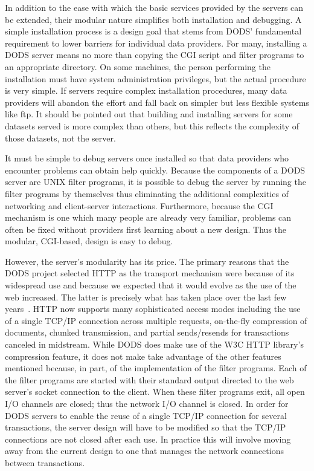 \documentclass{article}
\begin{document}
In addition to the ease with which the basic services provided by the servers
can be extended, their modular nature simplifies both installation and
debugging. A simple installation process is a design goal that stems from
\ac{DODS}' fundamental requirement to lower barriers for individual data
providers. For many, installing a \ac{DODS} server means no more than copying
the \ac{CGI} script and filter programs to an appropriate directory. On some
machines, the person performing the installation must have system
administration privileges, but the actual procedure is very simple. If
servers require complex installation procedures, many data providers will
abandon the effort and fall back on simpler but less flexible systems like
ftp. It should be pointed out that building and installing servers for some
datasets served is more complex than others, but this reflects the complexity
of those datasets, not the server.

It must be simple to debug servers once installed so that data providers who
encounter problems can obtain help quickly. Because the components of a
\ac{DODS} server are UNIX filter programs, it is possible to debug the server
by running the filter programs by themselves thus eliminating the additional
complexities of networking and client-server interactions.  Furthermore,
because the \ac{CGI} mechanism is one which many people are already very
familiar, problems can often be fixed without providers first learning about
a new design. Thus the modular, \ac{CGI}-based, design is easy to debug.

However, the server's modularity has its price. The primary reasons that the
DODS project selected HTTP as the transport mechanism were because of its
widespread use and because we expected that it would evolve as the use of the
web increased. The latter is precisely what has taken place over the last few
years~\cite{nielsen:http}. \acs{HTTP} now supports many sophisticated access
modes including the use of a single \acs{TCP/IP} connection across multiple
requests, on-the-fly compression of documents, chunked transmission, and
partial sends/resends for transactions canceled in midstream. While \ac{DODS}
does make use of the \acs{W3C} \acs{HTTP} library's compression feature, it
does not make take advantage of the other features mentioned because, in
part, of the implementation of the filter programs.  Each of the filter
programs are started with their standard output directed to the web server's
socket connection to the client. When these filter programs exit, all open
I/O channels are closed; thus the network I/O channel is closed. In order for
\ac{DODS} servers to enable the reuse of a single \acs{TCP/IP} connection for
several transactions, the server design will have to be modified so that the
\acs{TCP/IP} connections are not closed after each use. In practice this will
involve moving away from the current design to one that manages the network
connections between transactions.
\end{document}

